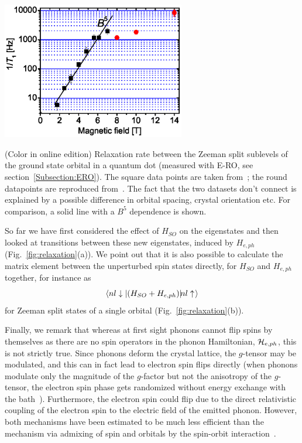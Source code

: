 \documentclass[rmp,twocolumn,aps]{revtex4}
\begin{document}
\bfig
\begin{center}
\includegraphics[width=8cm]{hanson_fig23.eps}
\end{center}
\caption{(Color in online edition) Relaxation rate between the Zeeman split sublevels of the
ground state orbital in a quantum dot (measured with E-RO, see section~\ref{Subsection:ERO}). The square data points are taken from~\textcite{amasha06}; the round datapoints are reproduced from~\textcite{ElzermanNature2004}. The fact that the two datasets don't connect is explained by a possible difference in orbital spacing, crystal orientation etc. For
comparison, a solid line with a $B^5$ dependence is shown.}
\label{fig:amasha_elzerman} \efig

So far we have first considered the effect of $H_{SO}$ on the
eigenstates and then looked at transitions between these new
eigenstates, induced by $H_{e,ph}$ (Fig.~\ref{fig:relaxation}(a)).
We point out that it is also possible to calculate the matrix
element between the unperturbed spin states directly, for $H_{SO}$
and $H_{e,ph}$ together, for instance as
$$
\mbox{$\langle nl\downarrow|$}(H_{SO} + H_{e,ph}) \mbox{$|\!nl\uparrow\;\!\rangle$}
$$
for Zeeman split states of a single orbital
(Fig.~\ref{fig:relaxation}(b)).

Finally, we remark that whereas at first sight phonons cannot flip
spins by themselves as there are no spin operators in the phonon
Hamiltonian, ${\cal H}_{e,ph}$, this is not strictly true.
Since phonons deform the crystal lattice, the $g$-tensor may be
modulated, and this can in fact lead to electron spin flips
directly (when phonons modulate only the magnitude of the
$g$-factor but not the anisotropy of the $g$-tensor, the electron
spin phase gets randomized without energy exchange with the
bath~\cite{semenov04}). Furthermore, the electron spin could flip
due to the direct relativistic coupling of the electron spin to
the electric field of the emitted phonon. However, both mechanisms
have been estimated to be much less efficient than the mechanism
via admixing of spin and orbitals by the spin-orbit
interaction~\cite{khaetskii00,khaetskii01}.
\end{document}
